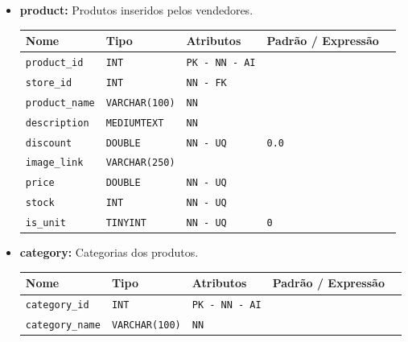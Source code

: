 \begin{itemize}
    \item \textbf{product:}
    Produtos inseridos pelos vendedores. 
    \begin{table}[H]
        \centering
        \begin{tabularx}{\linewidth}{XXXXX}
        \toprule
        \textbf{\color{color_scheme}Nome} & \textbf{\color{color_scheme}Tipo} & \textbf{\color{color_scheme}Atributos} & \textbf{\color{color_scheme}Padrão / Expressão}\\
        \midrule
        \texttt{product\_id} & \texttt{INT} & \texttt{PK - NN - AI} &\\
        \texttt{store\_id} & \texttt{INT} & \texttt{NN - FK} & \\
        \texttt{product\_name} & \texttt{VARCHAR(100)}  & \texttt{NN}  & \\
        \texttt{description} & \texttt{MEDIUMTEXT}  & \texttt{NN}  & \\
        \texttt{discount} & \texttt{DOUBLE}  & \texttt{NN - UQ}  & \texttt{0.0}\\
        \texttt{image\_link} & \texttt{VARCHAR(250)}  &  & \\
        \texttt{price} & \texttt{DOUBLE}  & \texttt{NN - UQ}  & \\
        \texttt{stock} & \texttt{INT}  & \texttt{NN - UQ}  & \\
        \texttt{is\_unit} & \texttt{TINYINT}  & \texttt{NN - UQ} & \texttt{0} \\
        \bottomrule
        \end{tabularx}
        \label{table: product}
    \end{table}

    \vspace{3pt}

    \item \textbf{category:}
    Categorias dos produtos. 
    \begin{table}[H]
        \centering
        \begin{tabularx}{\linewidth}{XXXXX}
        \toprule
        \textbf{\color{color_scheme}Nome} & \textbf{\color{color_scheme}Tipo} & \textbf{\color{color_scheme}Atributos} & \textbf{\color{color_scheme}Padrão / Expressão}\\
        \midrule
        \texttt{category\_id} & \texttt{INT} & \texttt{PK - NN - AI} &\\
        \texttt{category\_name} & \texttt{VARCHAR(100)}  & \texttt{NN}  & \\
        \bottomrule
        \end{tabularx}
        \label{table: categories}
    \end{table}


\end{itemize}

